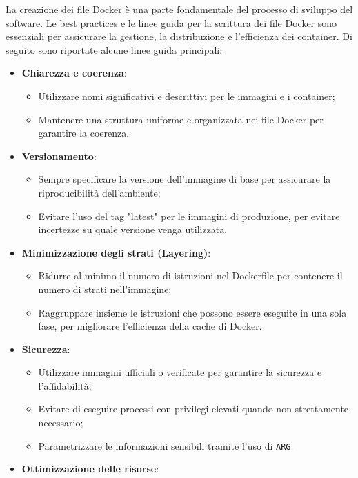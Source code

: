 La creazione dei file Docker è una parte fondamentale del processo di sviluppo del software. Le best practices e le linee guida per la scrittura dei file Docker sono essenziali per assicurare la gestione, la distribuzione e l'efficienza dei container. Di seguito sono riportate alcune linee guida principali:
\begin{itemize}
    \item \textbf{Chiarezza e coerenza}:
    \begin{itemize}
        \item Utilizzare nomi significativi e descrittivi per le immagini e i container;
        \item Mantenere una struttura uniforme e organizzata nei file Docker per garantire la coerenza.
    \end{itemize}
    \item \textbf{Versionamento}:
    \begin{itemize}
        \item Sempre specificare la versione dell'immagine di base per assicurare la riproducibilità dell'ambiente;
        \item Evitare l'uso del tag "latest" per le immagini di produzione, per evitare incertezze su quale versione venga utilizzata.
    \end{itemize}
    \item \textbf{Minimizzazione degli strati (Layering)}:
    \begin{itemize}
        \item Ridurre al minimo il numero di istruzioni nel Dockerfile per contenere il numero di strati nell'immagine;
        \item Raggruppare insieme le istruzioni che possono essere eseguite in una sola fase, per migliorare l'efficienza della cache di Docker.
    \end{itemize}
    \item \textbf{Sicurezza}:
    \begin{itemize}
        \item Utilizzare immagini ufficiali o verificate per garantire la sicurezza e l'affidabilità;
        \item Evitare di eseguire processi con privilegi elevati quando non strettamente necessario;
        \item Parametrizzare le informazioni sensibili tramite l'uso di \texttt{ARG}.
    \end{itemize}
    \item \textbf{Ottimizzazione delle risorse}:

\end{itemize}
